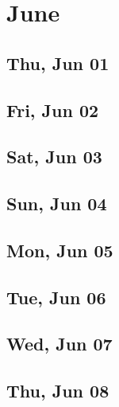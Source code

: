 \chapter{June}
	\section{Thu, Jun 01}
		
		
	\section{Fri, Jun 02}
		
		
	\section{Sat, Jun 03}
		
		
	\section{Sun, Jun 04}
		
		
	\section{Mon, Jun 05}
		
		
	\section{Tue, Jun 06}
		
		
	\section{Wed, Jun 07}
		
		
	\section{Thu, Jun 08}
		
		
